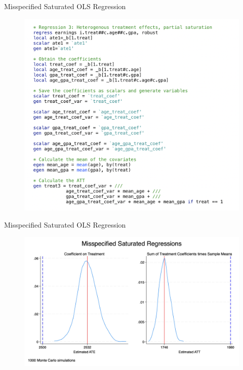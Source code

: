 \documentclass{beamer}
\begin{document}
\begin{frame}{Misspecified Saturated OLS Regression}

\begin{figure}[!t]\centering
\includegraphics[scale=0.3]{./lecture_includes/saturated_reg3}
\end{figure}

\end{frame}


\begin{frame}{Misspecified Saturated OLS Regression}

\begin{figure}[!t]\centering
\includegraphics[scale=0.1]{./lecture_includes/combined_saturated1.jpg}
\end{figure}

\end{frame}
\end{document}
